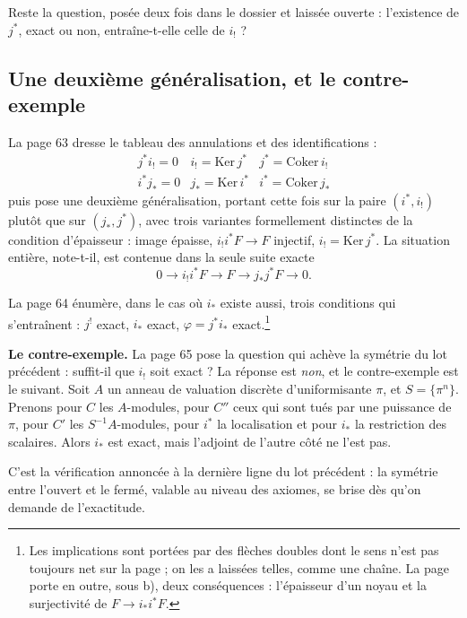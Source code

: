 \documentclass[11pt,a4paper]{article}
\begin{document}
Reste la question, posée deux fois dans le dossier et laissée ouverte : l'existence
de $j^{*}$, exact ou non, entraîne-t-elle celle de $i_{!}$ ?

\subsection*{Une deuxième généralisation, et le contre-exemple}

La page 63 dresse le tableau des annulations et des identifications :
\[
  \begin{array}{lll}
    j^{*} i_{!} = 0 & i_{!} = \mathrm{Ker}\,j^{*} &
      j^{*} = \mathrm{Coker}\,i_{!} \\[2pt]
    i^{*} j_{*} = 0 & j_{*} = \mathrm{Ker}\,i^{*} &
      i^{*} = \mathrm{Coker}\,j_{*}
  \end{array}
\]
puis pose une deuxième généralisation, portant cette fois sur la paire
$(i^{*}, i_{!})$ plutôt que sur $(j_{*}, j^{*})$, avec trois variantes
formellement distinctes de la condition d'épaisseur : image épaisse,
$i_{!}i^{*}F \to F$ injectif, $i_{!} = \mathrm{Ker}\,j^{*}$. La situation
entière, note-t-il, est contenue dans la seule suite exacte
\[
  0 \longrightarrow i_{!} i^{*} F \longrightarrow F \longrightarrow
  j_{*} j^{*} F \longrightarrow 0 .
\]

La page 64 énumère, dans le cas où $i_{*}$ existe aussi, trois conditions qui
s'entraînent : $j^{!}$ exact, $i_{*}$ exact, $\varphi = j^{*}i_{*}$
exact.\footnote{Les implications sont portées par des flèches doubles dont le
sens n'est pas toujours net sur la page ; on les a laissées telles, comme une
chaîne. La page porte en outre, sous b), deux conséquences : l'épaisseur d'un
noyau et la surjectivité de $F \to i_{*}i^{*}F$.}


\textbf{Le contre-exemple.} La page 65 pose la question qui achève la symétrie
du lot précédent : suffit-il que $i_{!}$ soit exact ? La réponse est
\emph{non}, et le contre-exemple est le suivant. Soit $A$ un anneau de
valuation discrète d'uniformisante $\pi$, et $S = \{\pi^{n}\}$. Prenons pour
$C$ les $A$-modules, pour $C''$ ceux qui sont tués par une puissance de $\pi$,
pour $C'$ les $S^{-1}A$-modules, pour $i^{*}$ la localisation et pour $i_{*}$
la restriction des scalaires. Alors $i_{*}$ est exact, mais l'adjoint de
l'autre côté ne l'est pas.

C'est la vérification annoncée à la dernière ligne du lot précédent : la
symétrie entre l'ouvert et le fermé, valable au niveau des axiomes, se brise
dès qu'on demande de l'exactitude.
\end{document}
